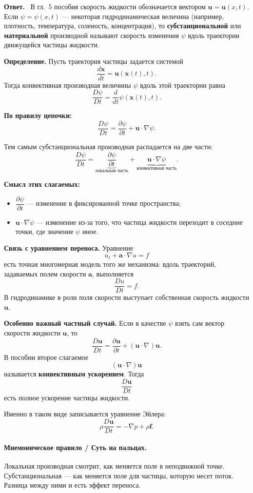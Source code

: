 \documentclass[a4paper,12pt]{article}
\newcommand{\Answer}{\textbf{Ответ.}\ }
\begin{document}
\Answer
В гл.~5 пособия скорость жидкости обозначается вектором $\mathbf{u}=\mathbf{u}(x,t)$. Если $\psi=\psi(x,t)$ --- некоторая гидродинамическая величина (например, плотность, температура, соленость, концентрация), то \textbf{субстанциональной} или \textbf{материальной} производной называют скорость изменения $\psi$ вдоль траектории движущейся частицы жидкости.

\textbf{Определение.} Пусть траектория частицы задается системой
\[
\frac{d\mathbf{x}}{dt}=\mathbf{u}(\mathbf{x}(t),t).
\]
Тогда конвективная производная величины $\psi$ вдоль этой траектории равна
\[
\frac{D\psi}{Dt}=\frac{d}{dt}\psi(\mathbf{x}(t),t).
\]

\textbf{По правилу цепочки:}
\[
\frac{D\psi}{Dt}
=
\frac{\partial \psi}{\partial t}
+\mathbf{u}\cdot\nabla\psi.
\]

Тем самым субстанциональная производная распадается на две части:
\[
\frac{D\psi}{Dt}
=
\underbrace{\frac{\partial \psi}{\partial t}}_{\text{локальная часть}}
+\underbrace{\mathbf{u}\cdot\nabla\psi}_{\text{конвективная часть}}.
\]

\textbf{Смысл этих слагаемых:}
\begin{itemize}
  \item $\dfrac{\partial \psi}{\partial t}$ --- изменение в фиксированной точке пространства;
  \item $\mathbf{u}\cdot\nabla\psi$ --- изменение из-за того, что частица жидкости переходит в соседние точки, где значение $\psi$ иное.
\end{itemize}

\textbf{Связь с уравнением переноса.} Уравнение
\[
u_t+\mathbf{a}\cdot\nabla u=f
\]
есть точная многомерная модель того же механизма: вдоль траекторий, задаваемых полем скорости $\mathbf{a}$, выполняется
\[
\frac{Du}{Dt}=f.
\]
В гидродинамике в роли поля скорости выступает собственная скорость жидкости $\mathbf{u}$.

\textbf{Особенно важный частный случай.} Если в качестве $\psi$ взять сам вектор скорости жидкости $\mathbf{u}$, то
\[
\frac{D\mathbf{u}}{Dt}
=
\frac{\partial \mathbf{u}}{\partial t}
+(\mathbf{u}\cdot\nabla)\mathbf{u}.
\]
В пособии второе слагаемое
\[
(\mathbf{u}\cdot\nabla)\mathbf{u}
\]
называется \textbf{конвективным ускорением}. Тогда
\[
\frac{D\mathbf{u}}{Dt}
\]
есть полное ускорение частицы жидкости.

Именно в таком виде записывается уравнение Эйлера:
\[
\rho\frac{D\mathbf{u}}{Dt}=-\nabla p+\rho\mathbf{f}.
\]

\paragraph{Мнемоническое правило / Суть на пальцах.}
Локальная производная смотрит, как меняется поле в неподвижной точке. Субстанциональная --- как меняется поле для частицы, которую несет поток. Разница между ними и есть эффект переноса.
\end{document}

